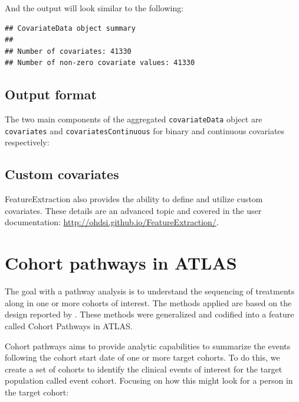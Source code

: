 \documentclass[11pt]{book}
\newenvironment{Shaded}{\begin{snugshade}}{\end{snugshade}}
\newcommand{\NormalTok}[1]{#1}
\newcommand{\OperatorTok}[1]{\textcolor[rgb]{0.81,0.36,0.00}{\textbf{#1}}}
\theoremstyle{definition}
\theoremstyle{definition}
\theoremstyle{definition}
\theoremstyle{remark}
\begin{document}
And the output will look similar to the following:

\begin{verbatim}
## CovariateData object summary 
## 
## Number of covariates: 41330 
## Number of non-zero covariate values: 41330
\end{verbatim}

\hypertarget{output-format}{%
\subsection{Output format}\label{output-format}}

The two main components of the aggregated \texttt{covariateData} object are \texttt{covariates} and \texttt{covariatesContinuous} for binary and continuous covariates respectively:

\begin{Shaded}
\end{Shaded}

\hypertarget{custom-covariates}{%
\subsection{Custom covariates}\label{custom-covariates}}

FeatureExtraction also provides the ability to define and utilize custom covariates. These details are an advanced topic and covered in the user documentation: \url{http://ohdsi.github.io/FeatureExtraction/}.

\hypertarget{cohort-pathways-in-atlas}{%
\section{Cohort pathways in ATLAS}\label{cohort-pathways-in-atlas}}

The goal with a pathway analysis is to understand the sequencing of treatments along in one or more cohorts of interest. The methods applied are based on the design reported by \citep{Hripcsak7329}. These methods were generalized and codified into a feature called Cohort Pathways in ATLAS.

Cohort pathways aims to provide analytic capabilities to summarize the events following the cohort start date of one or more target cohorts. To do this, we create a set of cohorts to identify the clinical events of interest for the target population called event cohort. Focusing on how this might look for a person in the target cohort:
\end{document}
